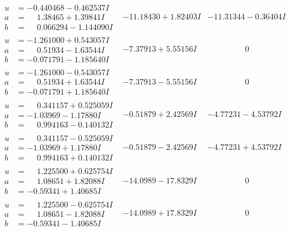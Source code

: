\documentclass[1p]{elsarticle_modified}
\theoremstyle{definition}
\begin{document}
$$\begin{array}{c|c|c}
\begin{aligned}
u &= -0.440468 - 0.462537 I \\
a &= \phantom{-}1.38465 + 1.39841 I \\
b &= \phantom{-}0.066294 - 1.144090 I\end{aligned}
 & -11.18430 + 1.82403 I & -11.31344 - 0.36404 I \\ \hline\begin{aligned}
u &= -1.261000 + 0.543057 I \\
a &= \phantom{-}0.51934 - 1.63544 I \\
b &= -0.071791 - 1.185640 I\end{aligned}
 & -7.37913 + 5.55156 I & \phantom{-0.000000 } 0 \\ \hline\begin{aligned}
u &= -1.261000 - 0.543057 I \\
a &= \phantom{-}0.51934 + 1.63544 I \\
b &= -0.071791 + 1.185640 I\end{aligned}
 & -7.37913 - 5.55156 I & \phantom{-0.000000 } 0 \\ \hline\begin{aligned}
u &= \phantom{-}0.341157 + 0.525059 I \\
a &= -1.03969 - 1.17880 I \\
b &= \phantom{-}0.994163 - 0.140132 I\end{aligned}
 & -0.51879 + 2.42569 I & -4.77231 - 4.53792 I \\ \hline\begin{aligned}
u &= \phantom{-}0.341157 - 0.525059 I \\
a &= -1.03969 + 1.17880 I \\
b &= \phantom{-}0.994163 + 0.140132 I\end{aligned}
 & -0.51879 - 2.42569 I & -4.77231 + 4.53792 I \\ \hline\begin{aligned}
u &= \phantom{-}1.225500 + 0.625754 I \\
a &= \phantom{-}1.08651 + 1.82088 I \\
b &= -0.59341 + 1.40685 I\end{aligned}
 & -14.0989 - 17.8329 I & \phantom{-0.000000 } 0 \\ \hline\begin{aligned}
u &= \phantom{-}1.225500 - 0.625754 I \\
a &= \phantom{-}1.08651 - 1.82088 I \\
b &= -0.59341 - 1.40685 I\end{aligned}
 & -14.0989 + 17.8329 I & \phantom{-0.000000 } 0 \\ \hline\begin{aligned}

\end{aligned}
\end{array}$$
\end{document}
